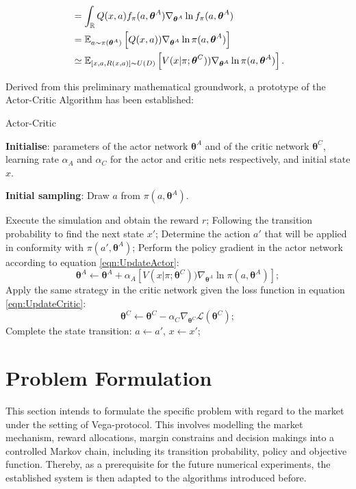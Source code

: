 \documentclass[11pt,twoside]{article}
\numberwithin{Theorem}{section}
\numberwithin{Definition}{section}
\numberwithin{Lemma}{section}
\numberwithin{Algorithm}{section}
\numberwithin{equation}{section}
\begin{document}
\begin{itemize}
\begin{align}
    &=\int_{\mathbb{R}}Q(x,a)f_{\pi}(a,\boldsymbol{\theta}^A)\nabla_{\boldsymbol{\theta}^A}\ln{f_{\pi}(a,\boldsymbol{\theta}^A)}\notag\\
    &=\mathbb{E}_{a\sim\pi(\boldsymbol{\theta}^A)}\left[
    Q(x,a))\nabla_{\boldsymbol{\theta}^A}\ln{\pi(a,\boldsymbol{\theta}^A)}\right]\notag\\
    &\simeq\mathbb{E}_{[x,a,R(x,a)]\sim U(D)}\left[V(x\vert\pi;\boldsymbol{\theta}^C))\nabla_{\boldsymbol{\theta}^A}\ln{\pi(a,\boldsymbol{\theta}^A)}\right].
    \end{align}
\end{itemize}

Derived from this preliminary mathematical groundwork, a prototype of the Actor-Critic Algorithm has been established:
\begin{algorithm}[H]
\caption{Actor-Critic}
\textbf{Initialise}: parameters of the actor network $\boldsymbol{\theta}^A$ and of the critic network $\boldsymbol{\theta}^C$, learning rate $\alpha_A$ and $\alpha_C$ for the actor and critic nets respectively, and initial state $x$.

\textbf{Initial sampling}: Draw $a$ from $\pi(a,\boldsymbol{\theta}^A)$.
    \begin{algorithmic}
        \State Execute the simulation and obtain the reward $r$;
        \State Following the transition probability to find the next state $x'$;
        \State Determine the action $a'$ that will be applied in  conformity with $\pi(a',\boldsymbol{\theta}^A)$;
        \State Perform the policy gradient in the actor network according to equation \ref{eqn:UpdateActor}: $$\boldsymbol{\theta}^A\gets\boldsymbol{\theta}^A+\alpha_A\left[V(x\vert\pi;\boldsymbol{\theta}^C))\nabla_{\boldsymbol{\theta}^A}\ln{\pi(a,\boldsymbol{\theta}^A)}\right];$$
        \State Apply the same strategy in the critic network given the loss function in equation \ref{eqn:UpdateCritic}:$$\boldsymbol{\theta}^C\gets\boldsymbol{\theta}^C-\alpha_C\nabla_{\boldsymbol{\theta}^C}\mathcal{L}(\boldsymbol{\theta}^C);$$
        \State Complete the state transition: $a\gets a'$, $x\gets x'$;
    \EndFor
    \end{algorithmic}
\end{algorithm}
\clearpage

\section{Problem Formulation}
This section intends to formulate the specific problem with regard to the market under the setting of Vega-protocol. This involves modelling the market mechanism, reward allocations, margin constrains and decision makings into a controlled Markov chain, including its transition probability, policy and objective function. Thereby,  as a prerequisite for the future numerical experiments, the established system is then adapted to the algorithms introduced before.
\clearpage
\end{document}
